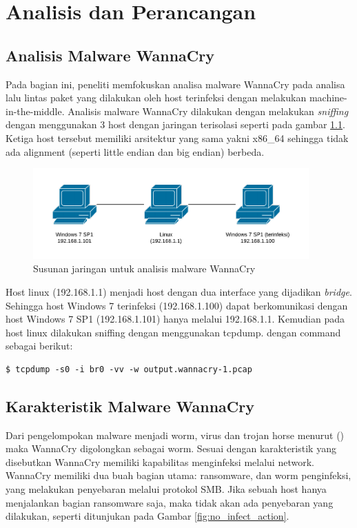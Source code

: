 \chapter{Analisis dan Perancangan}

\section{Analisis Malware WannaCry}

Pada bagian ini, peneliti memfokuskan analisa malware WannaCry pada analisa lalu lintas paket yang dilakukan oleh host terinfeksi dengan melakukan machine-in-the-middle. Analisis malware WannaCry dilakukan dengan melakukan \textit{sniffing} dengan menggunakan 3 host dengan jaringan terisolasi seperti pada gambar \ref{fig:analisis_malware_net}. 
Ketiga host tersebut memiliki arsitektur yang sama yakni x86\_64 sehingga tidak ada alignment (seperti little endian dan big endian) berbeda.

\begin{figure}[H]
	\centering
	\includegraphics[width=400px]{resources/analisis_malware_net.png}
	\caption{Susunan jaringan untuk analisis malware WannaCry}
	\label{fig:analisis_malware_net}
\end{figure}

Host linux (192.168.1.1) menjadi host dengan dua interface yang dijadikan \textit{bridge}. Sehingga host Windows 7 terinfeksi (192.168.1.100) dapat berkomunikasi dengan host Windows 7 SP1 (192.168.1.101) hanya melalui 192.168.1.1. Kemudian pada host linux dilakukan sniffing dengan menggunakan tcpdump. dengan command sebagai berikut:

\begin{verbatim}
$ tcpdump -s0 -i br0 -vv -w output.wannacry-1.pcap
\end{verbatim}

\section{Karakteristik Malware WannaCry}

Dari pengelompokan malware menjadi worm, virus dan trojan horse menurut (\cite{idika2007survey}) maka WannaCry digolongkan sebagai worm. Sesuai dengan karakteristik yang disebutkan WannaCry memiliki kapabilitas menginfeksi melalui network. WannaCry memiliki dua buah bagian utama: ransomware, dan worm penginfeksi, yang melakukan penyebaran melalui protokol SMB. Jika sebuah host hanya menjalankan bagian ransomware saja, maka tidak akan ada penyebaran yang dilakukan, seperti ditunjukan pada Gambar \ref{fig:no_infect_action}.

